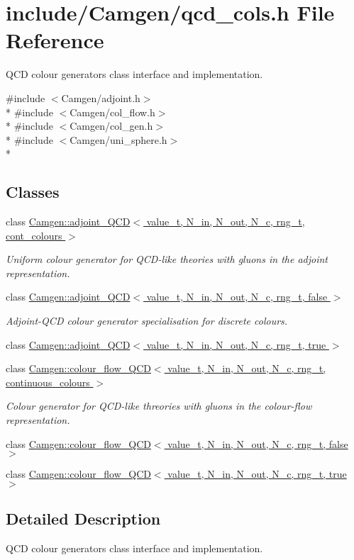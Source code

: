 \hypertarget{a00752}{}\section{include/\+Camgen/qcd\+\_\+cols.h File Reference}
\label{a00752}


Q\+C\+D colour generators class interface and implementation.  


{\ttfamily \#include $<$Camgen/adjoint.\+h$>$}\\*
{\ttfamily \#include $<$Camgen/col\+\_\+flow.\+h$>$}\\*
{\ttfamily \#include $<$Camgen/col\+\_\+gen.\+h$>$}\\*
{\ttfamily \#include $<$Camgen/uni\+\_\+sphere.\+h$>$}\\*
\subsection*{Classes}
\begin{DoxyCompactItemize}
\item 
class \hyperlink{a00003}{Camgen\+::adjoint\+\_\+\+Q\+C\+D$<$ value\+\_\+t, N\+\_\+in, N\+\_\+out, N\+\_\+c, rng\+\_\+t, cont\+\_\+colours $>$}
\begin{DoxyCompactList}\small\item\em Uniform colour generator for Q\+C\+D-\/like theories with gluons in the adjoint representation. \end{DoxyCompactList}\item 
class \hyperlink{a00004}{Camgen\+::adjoint\+\_\+\+Q\+C\+D$<$ value\+\_\+t, N\+\_\+in, N\+\_\+out, N\+\_\+c, rng\+\_\+t, false $>$}
\begin{DoxyCompactList}\small\item\em Adjoint-\/\+Q\+C\+D colour generator specialisation for discrete colours. \end{DoxyCompactList}\item 
class \hyperlink{a00005}{Camgen\+::adjoint\+\_\+\+Q\+C\+D$<$ value\+\_\+t, N\+\_\+in, N\+\_\+out, N\+\_\+c, rng\+\_\+t, true $>$}
\item 
class \hyperlink{a00074}{Camgen\+::colour\+\_\+flow\+\_\+\+Q\+C\+D$<$ value\+\_\+t, N\+\_\+in, N\+\_\+out, N\+\_\+c, rng\+\_\+t, continuous\+\_\+colours $>$}
\begin{DoxyCompactList}\small\item\em Colour generator for Q\+C\+D-\/like threories with gluons in the colour-\/flow representation. \end{DoxyCompactList}\item 
class \hyperlink{a00075}{Camgen\+::colour\+\_\+flow\+\_\+\+Q\+C\+D$<$ value\+\_\+t, N\+\_\+in, N\+\_\+out, N\+\_\+c, rng\+\_\+t, false $>$}
\item 
class \hyperlink{a00076}{Camgen\+::colour\+\_\+flow\+\_\+\+Q\+C\+D$<$ value\+\_\+t, N\+\_\+in, N\+\_\+out, N\+\_\+c, rng\+\_\+t, true $>$}
\end{DoxyCompactItemize}


\subsection{Detailed Description}
Q\+C\+D colour generators class interface and implementation. 

